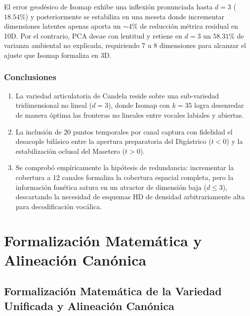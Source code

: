\documentclass[11pt,a4paper,openany]{book}
\theoremstyle{definition}
\begin{document}
El error geodésico de Isomap exhibe una inflexión pronunciada hasta $d=3$ ($18.54\%$) y posteriormente se estabiliza en una meseta donde incrementar dimensiones latentes apenas aporta un $\sim 4\%$ de reducción métrica residual en 10D. Por el contrario, PCA decae con lentitud y retiene en $d=3$ un $58.31\%$ de varianza ambiental no explicada, requiriendo 7 u 8 dimensiones para alcanzar el ajuste que Isomap formaliza en 3D.

\section{Conclusiones}

\begin{enumerate}
    \item La variedad articulatoria de Candela reside sobre una sub-variedad tridimensional no lineal ($d=3$), donde Isomap con $k=35$ logra desenredar de manera óptima las fronteras no lineales entre vocales labiales y abiertas.
    \item La inclusión de 20 puntos temporales por canal captura con fidelidad el desacople bifásico entre la apertura preparatoria del Digástrico ($t < 0$) y la estabilización oclusal del Masetero ($t > 0$).
    \item Se comprobó empíricamente la hipótesis de redundancia: incrementar la cobertura a 12 canales formaliza la cobertura espacial completa, pero la información fonética satura en un atractor de dimensión baja ($d \le 3$), descartando la necesidad de esquemas HD de densidad arbitrariamente alta para decodificación vocálica.
\end{enumerate}
\part{Formalización Matemática y Alineación Canónica}

\chapter{Formalización Matemática de la Variedad Unificada y Alineación Canónica}
\label{chap:guia_matematica_variedad}
\end{document}
